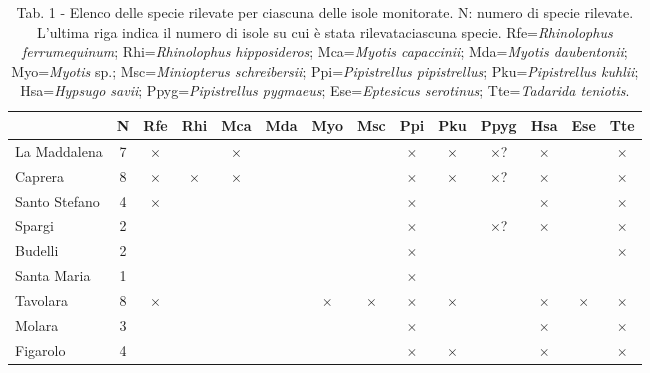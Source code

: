 \begin{multicols}{2}
\begin{compactdesc}
\begin{table}[t]
\caption*{Tab. 1 - Elenco delle specie rilevate per ciascuna delle isole monitorate. N\degree{}: numero di specie rilevate. L'ultima riga indica il numero di isole su cui è stata rilevataciascuna specie. Rfe=\emph{Rhinolophus ferrumequinum}; Rhi=\emph{Rhinolophus hipposideros}; Mca=\emph{Myotis capaccinii}; Mda=\emph{Myotis daubentonii}; Myo=\emph{Myotis} sp.; Msc=\emph{Miniopterus schreibersii}; Ppi=\emph{Pipistrellus pipistrellus}; Pku=\emph{Pipistrellus kuhlii}; Hsa=\emph{Hypsugo savii}; Ppyg=\emph{Pipistrellus pygmaeus}; Ese=\emph{Eptesicus serotinus}; Tte=\emph{Tadarida teniotis}.}
\centering\small
\begin{tabular}{lccccccccccccc}
\quad & \textbf{N\degree{}} & \textbf{Rfe} & \textbf{Rhi} & \textbf{Mca} & \textbf{Mda} & \textbf{Myo} & \textbf{Msc} & \textbf{Ppi} & \textbf{Pku} & \textbf{Ppyg} & \textbf{Hsa} & \textbf{Ese} & \textbf{Tte} \\
\hline
La Maddalena  &  7 & $\times$ &          & $\times$ &          &          &          & $\times$ & $\times$ & $\times$? & $\times$ &           & $\times$ \\
Caprera       &  8 & $\times$ & $\times$ & $\times$ &          &          &          & $\times$ & $\times$ & $\times$? & $\times$ &           & $\times$ \\
Santo Stefano &  4 & $\times$ &          &          &          &          &          & $\times$ &          &           & $\times$ &           & $\times$ \\
Spargi        &  2 &          &          &          &          &          &          & $\times$ &          & $\times$? & $\times$ &           & $\times$ \\
Budelli       &  2 &          &          &          &          &          &          & $\times$ &          &           &          &           & $\times$ \\
Santa Maria   &  1 &          &          &          &          &          &          & $\times$ &          &           &          &           &          \\
Tavolara      &  8 & $\times$ &          &          &          & $\times$ & $\times$ & $\times$ & $\times$ &           & $\times$ & $\times$  & $\times$ \\
Molara        &  3 &          &          &          &          &          &          & $\times$ &          &           & $\times$ &           & $\times$ \\
Figarolo      &  4 &          &          &          &          &          &          & $\times$ & $\times$ &           & $\times$ &           & $\times$ \\

\end{tabular}
\end{table}
\end{compactdesc}
\end{multicols}
